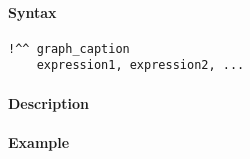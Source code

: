 


	\paragraph{Syntax}

\begin{verbatim}
!^^ graph_caption
    expression1, expression2, ...
\end{verbatim}

\paragraph{Description}

\paragraph{Example}


